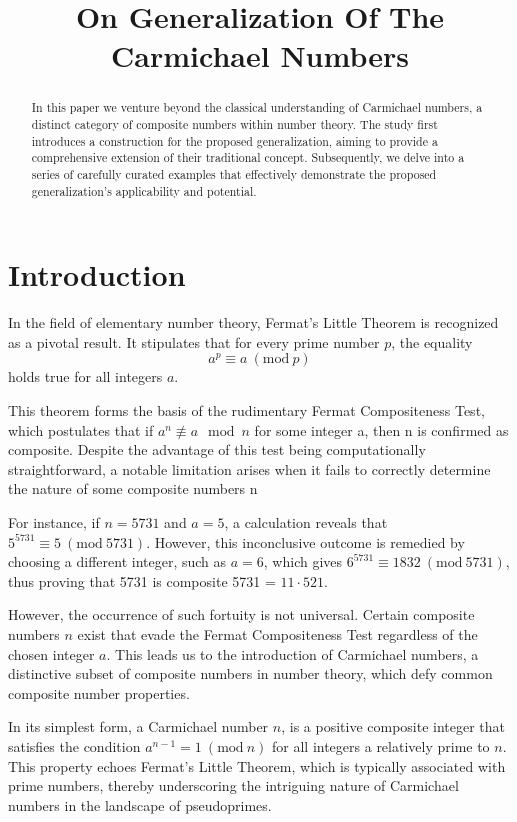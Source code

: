 \documentclass{article}
\date{}
\author{}
\title{On Generalization Of The Carmichael Numbers}
\theoremstyle{definition}
\theoremstyle{definition}
\begin{document}
\maketitle
\begin{abstract}
In this paper we venture beyond the classical understanding of Carmichael numbers, a distinct category of composite numbers within 
number theory. The study first introduces a construction for the proposed generalization, aiming to provide a comprehensive extension 
of their traditional concept. Subsequently, we delve into a series of carefully curated examples that effectively demonstrate the 
proposed generalization's applicability and potential.
\end{abstract}

\section{Introduction}
In the field of elementary number theory, Fermat’s Little Theorem is recognized as a pivotal result. It stipulates that for every 
prime number $p$, the equality $$a^p \equiv a \ (\textrm{mod}\ p)$$ holds true for all integers $a$.

This theorem forms the basis of the rudimentary Fermat Compositeness Test, which postulates that if $a^n \not\equiv a \mod n$ for 
some integer a, then n is confirmed as composite. Despite the advantage of this test being computationally straightforward, a notable 
limitation arises when it fails to correctly determine the nature of some composite numbers n 

For instance, if $n = 5731$ and $a = 5$, a calculation reveals that $5^{5731} \equiv 5 \ (\textrm{mod}\ 5731)$. However, this 
inconclusive outcome is remedied by choosing a different integer, such as 
$a = 6$, which gives $6^{5731} \equiv 1832 \ (\textrm{mod}\ 5731)$, thus proving that 5731 is composite 5731 = $11 \cdot 521$. 

However, the occurrence of such fortuity is not universal. Certain composite numbers $n$ exist that evade the Fermat Compositeness 
Test regardless of the chosen integer $a.$ This leads us to the introduction of Carmichael numbers, a distinctive subset of composite 
numbers in number theory, which defy common composite number properties.

In its simplest form, a Carmichael number $n$, is a positive composite integer that satisfies the condition 
$a^{n-1} = 1\ (\textrm{mod}\ n)$ for all integers a relatively prime to $n.$ This property echoes Fermat's Little Theorem, which is 
typically associated with prime numbers, thereby underscoring the intriguing nature of Carmichael numbers in the landscape of 
pseudoprimes.
\end{document}
